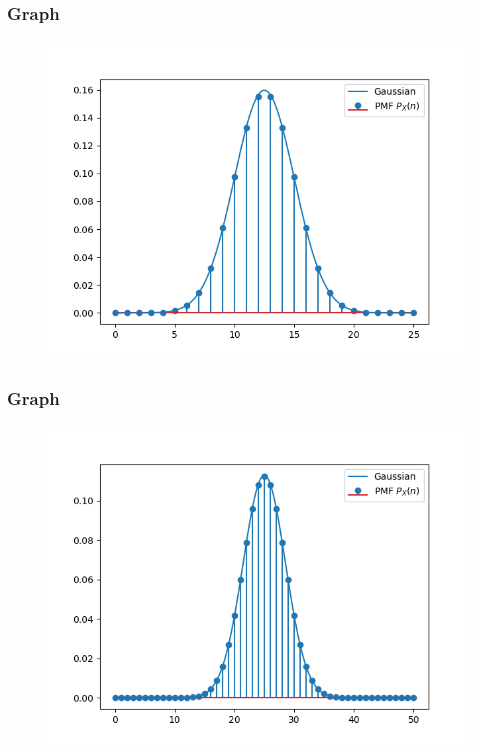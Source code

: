 \documentclass{beamer}
\theoremstyle{remark}
\numberwithin{equation}{section}
\begin{document}
      \begin{frame}[fragile]
        \frametitle{Graph}
        \begin{figure}[h!]
          \centering
          \includegraphics[width=1\columnwidth]{figs/pmf3.png}
          \label{stemplot}
        \end{figure}
      \end{frame}
      \begin{frame}[fragile]
        \frametitle{Graph}
        \begin{figure}[h!]
          \centering
          \includegraphics[width=1\columnwidth]{figs/pmf4.png}
          \label{stemplot}
        \end{figure}
      \end{frame}
\end{document}

